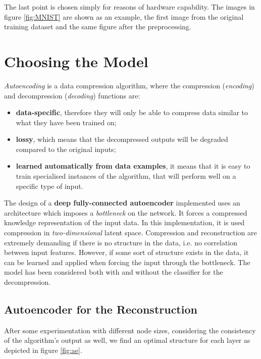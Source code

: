 \documentclass{article}
\begin{document}
The last point is chosen simply for reasons of hardware capability.
The images in figure \ref{fig:MNIST} are shown as an example, the first image from the original training dataset
and the same figure after the preprocessing.



\section{Choosing the Model}
\textit{Autoencoding} is a data compression algorithm, where the compression (\textit{encoding}) and decompression (\textit{decoding}) functions are:
\begin{itemize}
  \item \textbf{data-specific}, therefore they will only be able to compress data similar to what they have been trained on;
  \item \textbf{lossy}, which means that the decompressed outputs will be degraded compared to the original inputs;
  \item \textbf{learned automatically from data examples}, it means that it is easy to train specialised instances of the algorithm, 
          that will perform well on a specific type of input.
\end{itemize}

\par The design of a \textbf{deep fully-connected autoencoder} implemented uses an architecture which imposes a \textit{bottleneck} on the network. 
It forces a compressed knowledge representation of the input data.
In this implementation, it is used compression in \textit{two-dimensional} latent space. 
Compression and reconstruction are extremely demanding if there is no structure in the data, 
i.e. no correlation between input features. 
However, if some sort of structure exists in the data, it can be learned and applied when forcing the input through the bottleneck.
The model has been considered both with and without the classifier for the decompression.

\subsection{Autoencoder for the Reconstruction}
After some experimentation with different node sizes, considering the consistency of 
the algorithm's output as well, we find an optimal structure for each layer as depicted in figure \ref{fig:ae}. 
\end{document}
